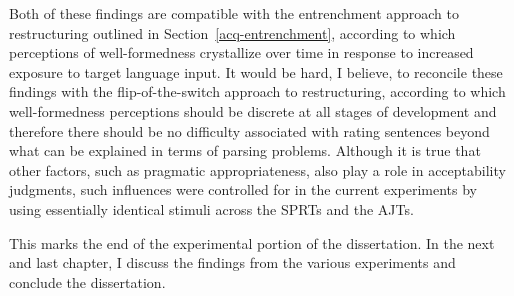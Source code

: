 Both of these findings are compatible with the entrenchment approach to restructuring outlined in Section~\ref{acq-entrenchment}, according to which perceptions of well-formedness crystallize over time in response to increased exposure to target language input. It would be hard, I believe, to reconcile these findings with the flip-of-the-switch approach to restructuring, according to which well-formedness perceptions should be discrete at all stages of development and therefore there should be no difficulty associated with rating sentences beyond what can be explained in terms of parsing problems. Although it is true that other factors, such as pragmatic appropriateness, also play a role in acceptability judgments, such influences were controlled for in the current experiments by using essentially identical stimuli across the SPRTs and the AJTs.

This marks the end of the experimental portion of the dissertation. In the next and last chapter, I discuss the findings from the various experiments and conclude the dissertation.